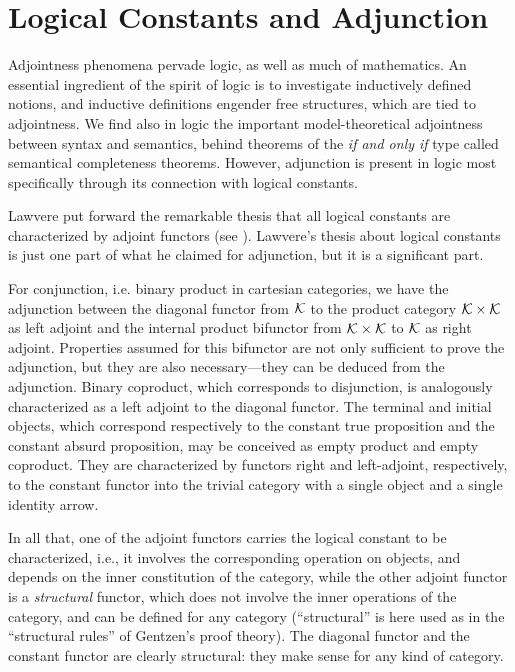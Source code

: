 \documentclass[12pt]{article}
\begin{document}
\section{Logical Constants and Adjunction}

\noindent Adjointness phenomena pervade logic, as well as much of
mathematics. An essential ingredient of the spirit of logic is to
investigate inductively defined notions, and inductive definitions engender
free structures, which are tied to adjointness. We find also in logic the
important model-theoretical adjointness between syntax and semantics, behind
theorems of the {\it if and only if} type called semantical completeness
theorems. However, adjunction is present in logic most specifically through
its connection with logical constants.

Lawvere put forward the remarkable thesis that all logical constants are
characterized by adjoint functors (see \cite{Law69}). Lawvere's thesis about
logical constants is just one part of what he claimed for adjunction, but it
is a significant part.

For conjunction, i.e. binary product in cartesian categories, we have the
adjunction between the diagonal functor from ${\cal K}$ to the product
category ${\cal K}\times {\cal K}$ as left adjoint and the internal product
bifunctor from ${\cal K}\times {\cal K}$ to ${\cal K}$ as right adjoint.
Properties assumed for this bifunctor are not only sufficient to prove the
adjunction, but they are also necessary---they can be deduced from the
adjunction. Binary coproduct, which corresponds to disjunction, is
analogously characterized as a left adjoint to the diagonal functor. The
terminal and initial objects, which correspond respectively to the constant
true proposition and the constant absurd proposition, may be conceived as
empty product and empty coproduct. They are characterized by functors right
and left-adjoint, respectively, to the constant functor into the trivial
category with a single object and a single identity arrow.

In all that, one of the adjoint functors carries the logical constant to be
characterized, i.e., it involves the corresponding operation on objects, and
depends on the inner constitution of the category, while the other adjoint
functor is a {\it structural} functor, which does not involve the inner
operations of the category, and can be defined for any category
(``structural'' is here used as in the ``structural rules'' of Gentzen's
proof theory). The diagonal functor and the constant functor are clearly
structural: they make sense for any kind of category.
\end{document}
